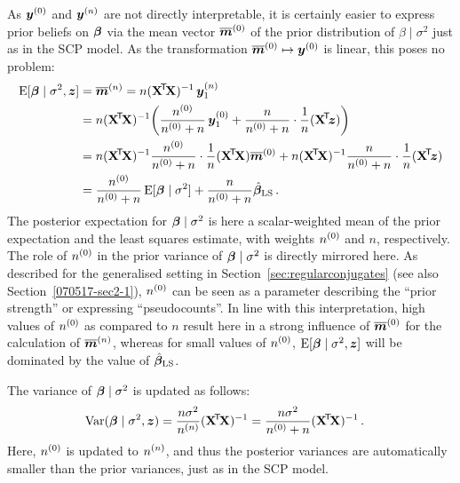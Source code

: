 As ${\bm y}^{(0)}$ and ${\bm y}^{(n)}$ are not directly interpretable, it is certainly easier 
to express prior beliefs on $\boldsymbol{\beta}$ via the mean vector $\overline{{\bm m}}^{(0)}$ of the prior distribution of
$\beta\mid\sigma^2$ just as in the SCP model.
As the transformation $\overline{{\bm m}}^{(0)} \mapsto {\bm y}^{(0)}$ is linear, this poses no problem:
\begin{align}
\E[\bbeta\mid\sigma^2,\z]
 &= \tmn %
  = n (\XtX)^{-1}\, \byn_1 \nonumber\\
 &= n (\XtX)^{-1} \bigg(\frac{\nz}{\nz + n}\,\byz_1 + \frac{n}{\nz + n}\cdot \frac{1}{n}(\Xtz) \bigg) \nonumber\\
 &= n (\XtX)^{-1} \frac{\nz}{\nz + n} \cdot \frac{1}{n}(\XtX) \tmz
  + n (\XtX)^{-1} \frac{n}  {\nz + n} \cdot \frac{1}{n}(\Xtz) \nonumber\\
 &= \frac{\nz}{\nz + n} \E[\bbeta\mid\sigma^2]
  + \frac{n}  {\nz + n} \bls\,.
  \label{equ:update_beta}
\end{align}
The posterior expectation for $\boldsymbol{\beta}\mid\sigma^2$ is here a
scalar-weighted mean of the prior expectation and the least squares
estimate, with weights $n^{(0)}$ and $n$, respectively. The role of
$n^{(0)}$ in the prior variance of $\boldsymbol{\beta}\mid\sigma^2$ is directly
mirrored here. As described for the generalised setting in
Section~\ref{sec:regularconjugates} (see also Section~\ref{070517-sec2-1}), $n^{(0)}$ can
be seen as a parameter describing the ``prior strength'' or
expressing ``pseudocounts''. In line with this interpretation, high
values of $n^{(0)}$ as compared to $n$ result here in a strong
influence of $\overline{{\bm m}}^{(0)}$ for the calculation of $\overline{{\bm m}}^{(n)}$, whereas for small
values of $n^{(0)}$, $\operatorname{E}[\boldsymbol{\beta}\mid\sigma^2,{\bm z}]$ %
will be dominated by the value of $\hat{\boldsymbol{\beta}}_\text{LS}$.

The variance of $\boldsymbol{\beta}\mid\sigma^2$ is updated as follows:
\begin{align}
\V(\bbeta\mid\sigma^2,\z) &= \frac{n\sigma^2}{\nn}(\XtX)^{-1} %
                           = \frac{n\sigma^2}{\nz + n}(\XtX)^{-1}\,. \nonumber%
\end{align}
Here, $n^{(0)}$ is updated to $n^{(n)}$, and thus the posterior variances are
automatically smaller than the prior variances, just as in the SCP model.
%
%

